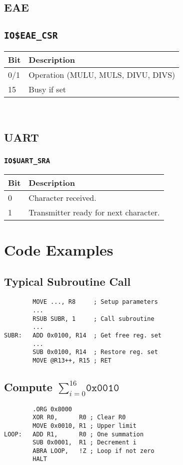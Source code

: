 \documentclass{leaflet}
\begin{document}
  \subsection{EAE}
   \subsection{\texttt{IO\$EAE\_CSR}}
    \begin{center}
     \begin{longtable}{|l|l|}
      \hline
       Bit&Description\\
      \hline
      \hline
       0/1&Operation (MULU, MULS, DIVU, DIVS)\\
       15&Busy if set\\
      \hline
     \end{longtable}
    \end{center}
%
~\vspace*{-20mm}
  \subsection{UART}
   \subsubsection{\texttt{IO\$UART\_SRA}}
    \begin{center}
     \begin{longtable}{|l|l|}
      \hline
       Bit&Description\\
      \hline
      \hline
       0&Character received.\\
       1&Transmitter ready for next character.\\
      \hline
     \end{longtable}
    \end{center}
    \vspace*{-16mm}
%
 \section{Code Examples}
  \subsection{Typical Subroutine Call}
   \begin{verbatim}
        MOVE ..., R8     ; Setup parameters 
        ...
        RSUB SUBR, 1     ; Call subroutine
        ...
SUBR:   ADD 0x0100, R14  ; Get free reg. set
        ...
        SUB 0x0100, R14  ; Restore reg. set
        MOVE @R13++, R15 ; RET
   \end{verbatim}
\vspace*{-5mm}
  \subsection{Compute $\sum_{i=0}^{16}{\texttt{0x0010}}$}
   \begin{verbatim}
        .ORG 0x8000
        XOR R0,      R0 ; Clear R0
        MOVE 0x0010, R1 ; Upper limit
LOOP:   ADD R1,      R0 ; One summation
        SUB 0x0001,  R1 ; Decrement i
        ABRA LOOP,   !Z ; Loop if not zero
        HALT
   \end{verbatim}
\end{document}
